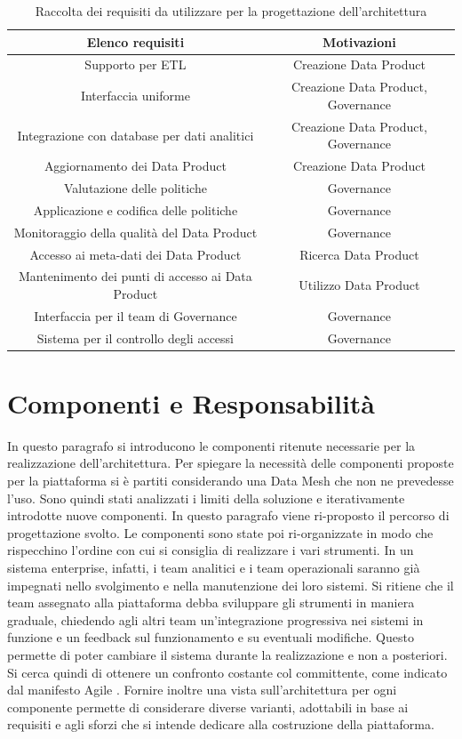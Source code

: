 \documentclass[a4paper,12pt]{report}
\begin{document}
\begin{table}
    \centering
    \begin{tabular}{|c|c|}
    \hline
        Elenco requisiti & Motivazioni\\
        \hline
        Supporto per ETL & Creazione Data Product \\
        Interfaccia uniforme & Creazione Data Product, Governance\\
        Integrazione con database per dati analitici & Creazione Data Product, Governance \\
        Aggiornamento dei Data Product  & Creazione Data Product\\
        Valutazione delle politiche & Governance \\
        Applicazione e codifica delle politiche & Governance  \\
        Monitoraggio della qualità  del Data Product & Governance \\
        Accesso ai meta-dati dei Data Product & Ricerca Data Product \\
        Mantenimento dei punti di accesso ai Data Product & Utilizzo Data Product \\
        Interfaccia per il team di Governance & Governance \\
        Sistema per il controllo degli accessi & Governance \\
    \hline
    \end{tabular}
    \caption{Raccolta dei requisiti da utilizzare per la progettazione dell'architettura}
    \label{tab:requisitiTec}
\end{table}
\section{Componenti e Responsabilità}\label{componenti e responsabilità}
In questo paragrafo  si introducono le componenti ritenute necessarie per la realizzazione dell'architettura.
Per spiegare la necessità delle componenti proposte per la piattaforma si è partiti considerando una Data Mesh che non ne prevedesse l'uso. 
Sono quindi stati analizzati i limiti della soluzione e iterativamente introdotte nuove componenti.
In questo paragrafo viene ri-proposto il percorso di progettazione svolto.
Le componenti sono state poi ri-organizzate in modo che rispecchino l'ordine con cui si consiglia di realizzare i vari strumenti.
In un sistema enterprise, infatti, i team analitici e i team operazionali saranno già impegnati nello svolgimento e nella manutenzione dei loro sistemi.
Si ritiene che il team assegnato alla piattaforma debba sviluppare gli strumenti in maniera graduale, chiedendo agli altri team un'integrazione progressiva nei sistemi in funzione e un feedback sul funzionamento e su eventuali modifiche.
Questo permette di poter cambiare il sistema durante la realizzazione e non a posteriori.
Si cerca quindi di ottenere un confronto costante col committente, come indicato dal manifesto Agile \cite{fowler2001agile}.
Fornire inoltre una vista sull'architettura per ogni componente permette di considerare diverse varianti, adottabili in base ai requisiti e agli sforzi che si intende dedicare alla costruzione della piattaforma.
\end{document}
